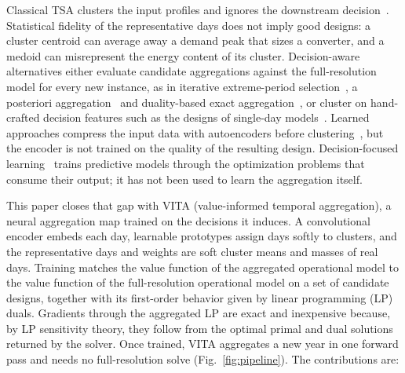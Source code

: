 \documentclass[journal]{IEEEtran}
\begin{document}
Classical TSA clusters the input profiles and ignores the downstream decision~\cite{kotzur2018impact,teichgraeber2019clustering}. Statistical fidelity of the representative days does not imply good designs: a cluster centroid can average away a demand peak that sizes a converter, and a medoid can misrepresent the energy content of its cluster. Decision-aware alternatives either evaluate candidate aggregations against the full-resolution model for every new instance, as in iterative extreme-period selection~\cite{teichgraeber2021iterative}, a posteriori aggregation~\cite{hilbers2023aposteriori} and duality-based exact aggregation~\cite{santosuosso2026marginal,rybka2026mlexact}, or cluster on hand-crafted decision features such as the designs of single-day models~\cite{sun2019costoriented,zhang2023modeladaptive}. Learned approaches compress the input data with autoencoders before clustering~\cite{barbar2022autoencoder}, but the encoder is not trained on the quality of the resulting design. Decision-focused learning~\cite{elmachtoub2022spo,mandi2024dfl} trains predictive models through the optimization problems that consume their output; it has not been used to learn the aggregation itself.

This paper closes that gap with VITA (value-informed temporal aggregation), a neural aggregation map trained on the decisions it induces. A convolutional encoder embeds each day, learnable prototypes assign days softly to clusters, and the representative days and weights are soft cluster means and masses of real days. Training matches the value function of the aggregated operational model to the value function of the full-resolution operational model on a set of candidate designs, together with its first-order behavior given by linear programming (LP) duals. Gradients through the aggregated LP are exact and inexpensive because, by LP sensitivity theory, they follow from the optimal primal and dual solutions returned by the solver. Once trained, VITA aggregates a new year in one forward pass and needs no full-resolution solve (Fig.~\ref{fig:pipeline}). The contributions are:


\end{document}
